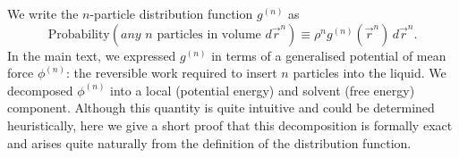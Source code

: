 \documentclass[12pt]{report}
\begin{document}
We write the $n$-particle distribution function $g^{(n)}$ as
\begin{equation}\label{eq:n-density-pdf}
  \textrm{Probability}\left( \textit{any } n \textrm{ particles in volume } d\vec{r}^n \right)
  \equiv
  \rho^n g^{(n)}(\vec{r}^n) \, d\vec{r}^n.
\end{equation}
In the main text, we expressed $g^{(n)}$ in terms of a generalised potential of mean force $\phi^{(n)}$: the reversible work required to insert $n$ particles into the liquid.
We decomposed $\phi^{(n)}$ into a local (potential energy) and solvent (free energy) component.
Although this quantity is quite intuitive and could be determined heuristically, here we give a short proof that this decomposition is formally exact and arises quite naturally from the definition of the distribution function.
\end{document}
